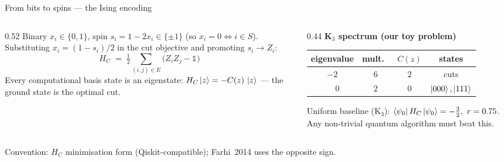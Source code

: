 \documentclass[aspectratio=169,10pt]{beamer}
\newcommand{\HC}{H_{C}}
\newcommand{\hz}[1]{\ket{#1}}
\newcommand{\one}{\mathbb{1}}
\begin{document}
\begin{frame}{From bits to spins — the Ising encoding}
  \begin{columns}[T,onlytextwidth]
    \begin{column}{0.52\textwidth}
      \small
      Binary $x_i\in\{0,1\}$, spin $s_i = 1-2x_i \in \{\pm1\}$
      (so $x_i{=}0\Leftrightarrow i\in S$).
      Substituting $x_i=(1-s_i)/2$ in the cut objective and promoting
      $s_i \to Z_i$:
      \[
        \boxed{\;\HC \;=\; \tfrac{1}{2}\sum_{(i,j)\in E}\bigl(Z_i Z_j - \one\bigr)\;}
      \]
      Every computational basis state is an eigenstate:
      $\HC \hz{z} = -C(z)\,\hz{z}$ — the \alert{ground state is the
      optimal cut}.
    \end{column}
    \begin{column}{0.44\textwidth}
      \textbf{K$_3$ spectrum (our toy problem)}
      \vspace{0.3em}
      \begin{center}
      \scriptsize
      \begin{tabular}{cccc}
        \toprule
        eigenvalue & mult.\ & $C(z)$ & states \\
        \midrule
        $-2$ & $6$ & $2$ & cuts \\
        $\phantom{-}0$ & $2$ & $0$ & $\hz{000},\hz{111}$ \\
        \bottomrule
      \end{tabular}
      \end{center}
      \vspace{0.3em}
      \small Uniform baseline (K$_3$):
      $\bra{\psi_0}\HC\ket{\psi_0} = -\tfrac{3}{2},\ r=0.75$.
      Any non-trivial quantum algorithm must beat this.
    \end{column}
  \end{columns}
  \vspace{0.3em}
  \scriptsize\color{gray}
  Convention: $\HC$ minimisation form (Qiskit-compatible); Farhi~2014
  uses the opposite sign.
\end{frame}
\end{document}

